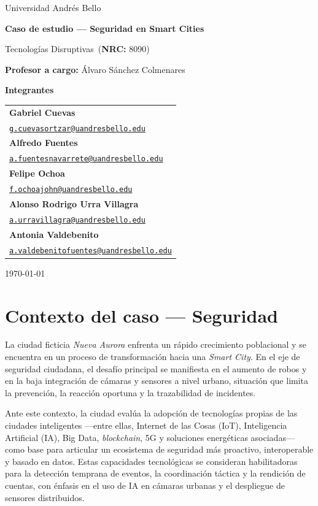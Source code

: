 \documentclass[12pt,a4paper]{article}
\makeatletter
\newcommand{\Universidad}{Universidad Andrés Bello}
\newcommand{\Materia}{Tecnologías Disruptivas}
\newcommand{\NRC}{8090}
\newcommand{\Profesor}{Álvaro Sánchez Colmenares}
\newcommand{\NombreCaso}{Caso de estudio — Seguridad en Smart Cities}
\newcommand{\Integrantes}{%
  \begin{tabular}{@{}l}
    \textbf{Gabriel Cuevas}\\[-2pt]
    \texttt{\href{mailto:g.cuevasortzar@uandresbello.edu}{g.cuevasortzar@uandresbello.edu}}\\[6pt]
    \textbf{Alfredo Fuentes}\\[-2pt]
    \texttt{\href{mailto:a.fuentesnavarrete@uandresbello.edu}{a.fuentesnavarrete@uandresbello.edu}}\\[6pt]
    \textbf{Felipe Ochoa}\\[-2pt]
    \texttt{\href{mailto:f.ochoajohn@uandresbello.edu}{f.ochoajohn@uandresbello.edu}}\\[6pt]
    \textbf{Alonso Rodrigo Urra Villagra}\\[-2pt]
    \texttt{\href{mailto:a.urravillagra@uandresbello.edu}{a.urravillagra@uandresbello.edu}}\\[6pt]
    \textbf{Antonia Valdebenito}\\[-2pt]
    \texttt{\href{mailto:a.valdebenitofuentes@uandresbello.edu}{a.valdebenitofuentes@uandresbello.edu}}
  \end{tabular}
}
\newcommand{\Fecha}{\today}
\makeatother
\begin{document}
\begin{titlepage}
  \centering
  \vspace*{1cm}
  {\Large \Universidad\par}
  \vspace{3cm}
  {\LARGE\bfseries \NombreCaso\par}
  \vspace{1.5cm}
  {\large \Materia\ (\textbf{NRC:} \NRC)\par}
  \vspace{0.4cm}
  {\large \textbf{Profesor a cargo:} \Profesor\par}
  \vspace{2.2cm}
  {\large \textbf{Integrantes}\par}
  \vspace{0.3cm}
  {\large \Integrantes\par}
  \vfill
  {\large \Fecha\par}
\end{titlepage}

\clearpage
{}  %
\justifying             %

\section*{Contexto del caso — Seguridad}

La ciudad ficticia \textit{Nueva Aurora} enfrenta un rápido crecimiento poblacional y se encuentra en un proceso de transformación hacia una \textit{Smart City}. En el eje de seguridad ciudadana, el desafío principal se manifiesta en el aumento de robos y en la baja integración de cámaras y sensores a nivel urbano, situación que limita la prevención, la reacción oportuna y la trazabilidad de incidentes.

Ante este contexto, la ciudad evalúa la adopción de tecnologías propias de las ciudades inteligentes —entre ellas, Internet de las Cosas (IoT), Inteligencia Artificial (IA), Big Data, \textit{blockchain}, 5G y soluciones energéticas asociadas— como base para articular un ecosistema de seguridad más proactivo, interoperable y basado en datos. Estas capacidades tecnológicas se consideran habilitadoras para la detección temprana de eventos, la coordinación táctica y la rendición de cuentas, con énfasis en el uso de IA en cámaras urbanas y el despliegue de sensores distribuidos.
\end{document}
